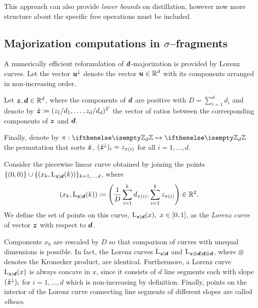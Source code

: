 \documentclass[pra,
aps,
twocolumn,
superscriptaddress,
groupedaddress,
nofootinbib,
reprint
]{revtex4-1}
\begin{document}
This approach can also provide \emph{lower bounds} on distillation, however now more structure about the specific free operations must be included. 

\subsection{Majorization computations in $\sigma$--fragments}
A numerically efficient reformulation of $\bm{d}$-majorization is provided by Lorenz curves.
Let the vector $\bm{u}^\downarrow$ denote the vector $\bm{u} \in \mathbb{R}^d$ with its components arranged in non-increasing order.
\begin{definition}\label{def:lc}
    Let $\bm{z}, \bm{d} \in \mathbb{R}^d$, where the components of $\bm{d}$ are positive with $D = \sum_{i=1}^d d_i$ and denote by $\tilde{\bm{z}} \coloneqq (z_1/d_1, \dots, z_d/d_d)^T$ the vector of ratios between the corresponding components of $\bm{z}$ and $\bm{d}$.
    
    Finally, denote by $\pi: \zd \mapsto \zd$ the permutation that sorts $\tilde{\bm{z}}$, $(\tilde{\bm{z}}^\downarrow)_i = z_{\pi(i)}$ for all $i=1,\dots,d$.
    
    Consider the piecewise linear curve obtained by joining the points $\{(0,0)\} \cup \{ (x_k, {{\rm{L}}_{\bm{z}|\bm{d}}}(k)) \}_{k=1,\dots,d}$, where
    \begin{equation}\label{eq:lorenz}
        (x_k, {{\rm{L}}_{\bm{z}|\bm{d}}}(k)) \coloneqq \left( \frac{1}{D}\sum_{i=1}^k d_{\pi(i)}, \sum_{i=1}^k z_{\pi(i)} \right) \in \mathbb{R}^2.
    \end{equation}
    We define the set of points on this curve, ${{\rm{L}}_{\bm{z}|\bm{d}}}(x),\ x \in [0,1]$, as the \emph{Lorenz curve} of vector $\bm{z}$ with respect to $\bm{d}$.
\end{definition}
Components $x_k$ are rescaled by $D$ so that comparison of curves with unequal dimensions is possible.
In fact, the Lorenz curves ${{\rm{L}}_{\bm{z}|\bm{d}}}$ and ${{\rm{L}}_{\bm{z} \otimes \bm{d}|\bm{d} \otimes \bm{d}}}$, where $\otimes$ denotes the Kronecker product, are identical.
Furthermore, a Lorenz curve ${{\rm{L}}_{\bm{z}|\bm{d}}}(x)$ is always concave in $x$, since it consists of $d$ line segments each with slope $(\tilde{\bm{z}}^\downarrow)_i$ for $i=1,\dots,d$ which is non-increasing by definition.
Finally, points on the interior of the Lorenz curve connecting line segments of different slopes are called \emph{elbows}.
\end{document}
